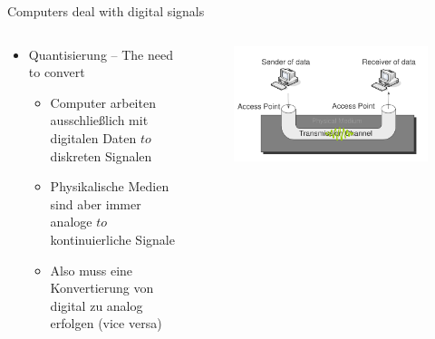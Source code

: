 \documentclass[xcolor=dvipsnames,aspectratio=169]{beamer}
\begin{document}
\begin{frame}{Computers deal with digital signals}
\begin{columns}[T] %
\begin{column}{.48\textwidth}
\begin{itemize}
	\item Quantisierung -- The need to convert
	\begin{itemize}
		\item Computer arbeiten ausschließlich mit digitalen Daten $to$ diskreten Signalen
		\item Physikalische Medien sind aber immer analoge $to$ kontinuierliche Signale
		\item Also muss eine Konvertierung von digital zu analog erfolgen (vice versa)
	\end{itemize}
\end{itemize}
\end{column}%
\hfill%
\begin{column}{.48\textwidth}
\begin{figure}
\includegraphics[scale=0.3]{rxtx}
\end{figure}
\end{column}%
\end{columns}
\end{frame}
\end{document}
